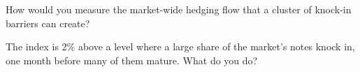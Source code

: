 \begin{interviewq}\label{iq:dv:autocallables:5}
How would you measure the market-wide hedging flow that a cluster of knock-in barriers can create?
\end{interviewq}

\begin{interviewq}\label{iq:dv:autocallables:6}
The index is 2\% above a level where a large share of the market's notes knock in, one month before many of them mature. What do you
do?
\end{interviewq}
